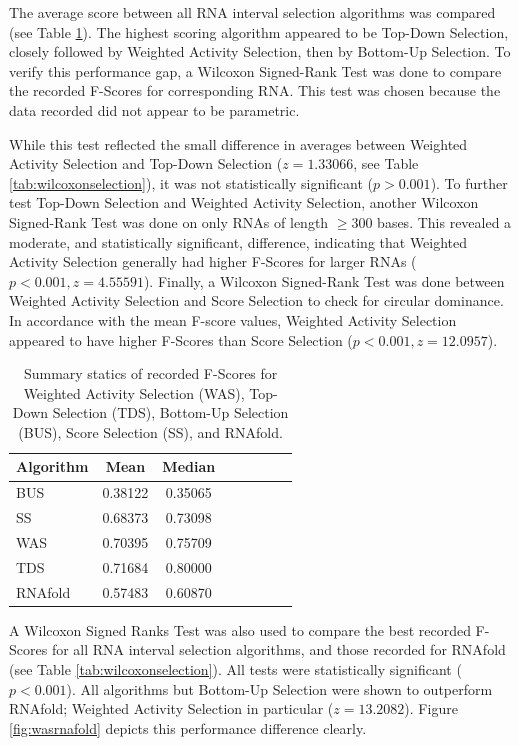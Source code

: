 \documentclass{cshonours}
\begin{document}
The average score between all RNA interval selection algorithms was compared (see Table \ref{tab:summaryselection}). The highest scoring algorithm appeared to be Top-Down Selection, closely followed by Weighted Activity Selection, then by Bottom-Up Selection. To verify this performance gap, a Wilcoxon Signed-Rank Test was done to compare the recorded F-Scores for corresponding RNA. This test was chosen because the data recorded did not appear to be parametric.

While this test reflected the small difference in averages between Weighted Activity Selection and Top-Down Selection ($z = 1.33066$, see Table \ref{tab:wilcoxonselection}), it was not statistically significant ($p > 0.001$). To further test Top-Down Selection and Weighted Activity Selection, another Wilcoxon Signed-Rank Test was done on only RNAs of length $\geq 300$ bases. This revealed a moderate, and statistically significant, difference, indicating that Weighted Activity Selection generally had higher F-Scores for larger RNAs ($p < 0.001, z = 4.55591$). Finally, a Wilcoxon Signed-Rank Test was done between Weighted Activity Selection and Score Selection to check for circular dominance. In accordance with the mean F-score values, Weighted Activity Selection appeared to have higher F-Scores than Score Selection ($p < 0.001, z = 12.0957$).

\begin{table}
\centering
\begin{tabular}{l*{6}{c}r}
Algorithm	& Mean & Median \\
\hline
BUS &  0.38122    &    0.35065   \\
SS & 0.68373    &    0.73098  \\
WAS & 0.70395   &     0.75709  \\
TDS & 0.71684   &     0.80000  \\
\hline
RNAfold & 0.57483    &    0.60870 \\
\end{tabular}

\caption{Summary statics of recorded F-Scores for Weighted Activity Selection (WAS), Top-Down Selection (TDS), Bottom-Up Selection (BUS), Score Selection (SS), and RNAfold.}
\label{tab:summaryselection}
\end{table}



A Wilcoxon Signed Ranks Test was also used to compare the best recorded F-Scores for all RNA interval selection algorithms, and those recorded for RNAfold (see Table \ref{tab:wilcoxonselection}). All tests were statistically significant ($p < 0.001$). All algorithms but Bottom-Up Selection were shown to outperform RNAfold; Weighted Activity Selection in particular ($z = 13.2082$). Figure \ref{fig:wasrnafold} depicts this performance difference clearly.
\end{document}
